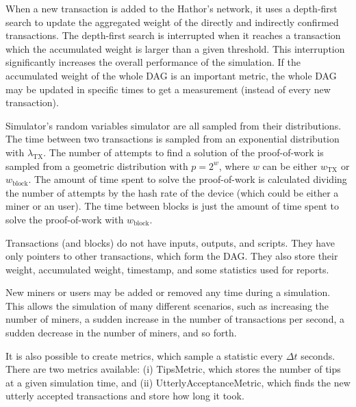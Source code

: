 When a new transaction is added to the Hathor's network, it uses a depth-first search \citep{cormen2009introduction} to update the aggregated weight of the directly and indirectly confirmed transactions. The depth-first search is interrupted when it reaches a transaction which the accumulated weight is larger than a given threshold. This interruption significantly increases the overall performance of the simulation. If the accumulated weight of the whole DAG is an important metric, the whole DAG may be updated in specific times to get a measurement (instead of every new transaction).


Simulator's random variables simulator are all sampled from their distributions. The time between two transactions is sampled from an exponential distribution with $\lambda_\text{TX}$. The number of attempts to find a solution of the proof-of-work is sampled from a geometric distribution with $p=2^{w}$, where $w$ can be either $w_\text{TX}$ or $w_\text{block}$. The amount of time spent to solve the proof-of-work is calculated dividing the number of attempts by the hash rate of the device (which could be either a miner or an user). The time between blocks is just the amount of time spent to solve the proof-of-work with $w_\text{block}$.

Transactions (and blocks) do not have inputs, outputs, and scripts. They have only pointers to other transactions, which form the DAG. They also store their weight, accumulated weight, timestamp, and some statistics used for reports.

New miners or users may be added or removed any time during a simulation. This allows the simulation of many different scenarios, such as increasing the number of miners, a sudden increase in the number of transactions per second, a sudden decrease in the number of miners, and so forth.

It is also possible to create metrics, which sample a statistic every $\Delta t$ seconds. There are two metrics available: (i) TipsMetric, which stores the number of tips at a given simulation time, and (ii) UtterlyAcceptanceMetric, which finds the new utterly accepted transactions and store how long it took.

